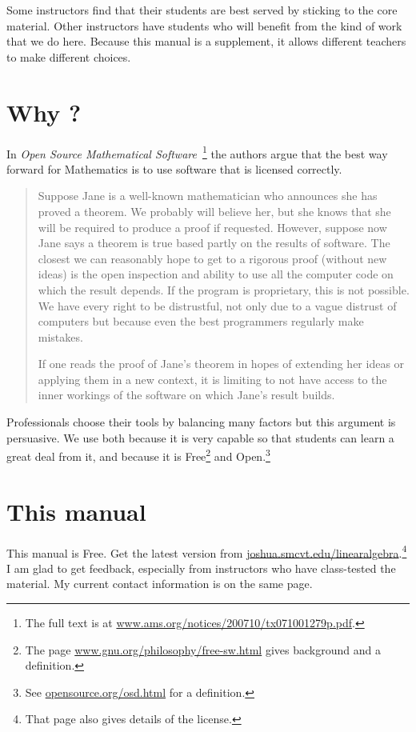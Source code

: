 Some instructors find that their students are best served by
sticking to the
core material.
Other instructors
have students who will benefit from the kind of work that
we do here.
Because this manual is a supplement, it allows different 
teachers to make different choices.


\section{Why \Sage?}
In 
\textit{Open Source Mathematical Software\,} \citep{JoynerStein07}\footnote{The full text is at
\protect\url{www.ams.org/notices/200710/tx071001279p.pdf}.}
the authors argue that the best way forward for Mathematics 
is to use software that is licensed correctly.

\begin{quotation}\small
Suppose Jane is a well-known mathematician who announces
she has proved a theorem. We probably will believe
her, but she knows that she will be required to produce
a proof if requested. However, suppose now Jane says a
theorem is true based partly on the results of software. The
closest we can reasonably hope to get to a rigorous proof
(without new ideas) is the open inspection and ability to use
all the computer code on which the result depends. If the
program is proprietary, this is not possible. We have every
right to be distrustful, not only due to a vague distrust of
computers but because even the best programmers regularly
make mistakes.

If one reads the proof of Jane’s theorem in hopes of
extending her ideas or applying them in a new context, it
is limiting to not have access to the inner workings of the
software on which Jane’s result builds.
\end{quotation}  
Professionals choose their tools by balancing many factors but
this argument is persuasive.
We use \Sage{} both because it is very capable 
so that students can 
learn a great deal from it,
and because it is 
Free\footnote{The page 
\protect\url{www.gnu.org/philosophy/free-sw.html} 
gives background and a definition.} 
and Open.\footnote{See \protect\url{opensource.org/osd.html} 
for a definition.} 



\section{This manual}
This manual is Free.
Get the latest version from 
\url{joshua.smcvt.edu/linearalgebra}.\footnote{%
  That page also gives details of the license.}
I am glad to get feedback, especially from instructors
who have class-tested the material.
My current contact information is on the same page.

